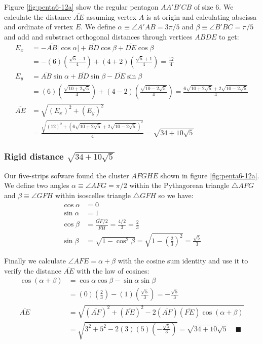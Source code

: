 \documentclass[11pt]{article}
\begin{document}
Figure \ref{fig:penta6-12a} show the regular pentagon $AA'B'CB$ of size $6$. We calculate the distance $\overline{AE}$ assuming vertex $A$ is at origin and calculating abscissa and ordinate of vertex $E$. We define $\alpha \equiv \angle{A'AB} = 3\pi / 5$ and $\beta \equiv \angle{B'BC} = \pi / 5$ and add and substract orthogonal distances through vertices $ABDE$ to get:
\begin{align}
E_x &= -\overline{AB}|\cos\alpha| + \overline{BD}\cos\beta + \overline{DE}\cos\beta \nonumber\\
 &= -(6)\left(\frac{\sqrt5 - 1}4\right) + (4+2)\left(\frac{\sqrt5+1}4\right)
 = \frac{12}4 \\
E_y &= \overline{AB}\sin\alpha + \overline{BD}\sin\beta - \overline{DE}\sin\beta \nonumber\\
 &= (6)\left(\frac{\sqrt{10+2\sqrt5}}4\right) + (4-2)\left(\frac{\sqrt{10-2\sqrt5}}4\right)
 = \frac{6\sqrt{10+2\sqrt5} + 2\sqrt{10-2\sqrt5}}4 \\
%
\overline{AE} &= \sqrt{(E_x)^2 + (E_y)^2} \nonumber\\
 &= \frac{\sqrt{(12)^2 + (6\sqrt{10+2\sqrt5} +2\sqrt{10-2\sqrt5})^2}}4
 = \sqrt{34 + 10\sqrt5}
\end{align}

\subsubsection{Rigid distance $\sqrt{34 + 10\sqrt5}$}

Our five-strips sofware found the cluster $AFGHE$ shown in figure \ref{fig:penta6-12a}. We define two angles $\alpha \equiv \angle{AFG} = \pi/2$ within the Pythagorean triangle $\triangle{AFG}$ and $\beta \equiv \angle{GFH}$ within isoscelles triangle $\triangle{GFH}$ so we have:
\begin{align}
\cos\alpha &= 0\\
\sin\alpha &= 1\\
\cos\beta &= \frac{\overline{GF} / 2}{\overline{FH}} = \frac{4/2}{3} = \frac{2}3\\
\sin\beta &= \sqrt{1 - \cos^2\beta} = \sqrt{1 - \left(\frac{2}3\right)^2} = \frac{\sqrt5}3
\end{align}

Finally we calculate $\angle{AFE} = \alpha + \beta$ with the cosine sum identity and use it to verify the distance $\overline{AE}$ with the law of cosines:
\begin{align}
\cos(\alpha+\beta) &= \cos\alpha\cos\beta - \sin\alpha\sin\beta \nonumber\\
 &= (0)\left(\frac{2}3\right) - (1)\left(\frac{\sqrt5}3\right) = -\frac{\sqrt5}3 \\
%
\overline{AE} &= \sqrt{(\overline{AF})^2 + (\overline{FE})^2 
 - 2(\overline{AF})(\overline{FE})\cos(\alpha + \beta)} \nonumber\\
 &= \sqrt{3^2 + 5^2 - 2(3)(5)\left(-\frac{\sqrt5}3\right)}
 = \sqrt{34 + 10\sqrt5} \quad \blacksquare
\end{align}
\end{document}
